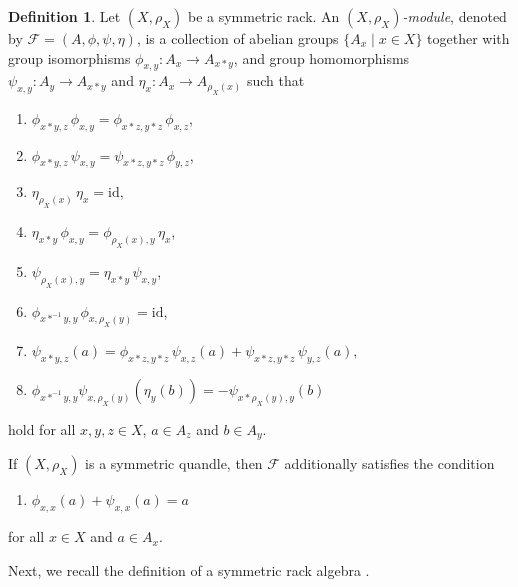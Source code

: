 \documentclass[11pt,reqno]{amsart}
\theoremstyle{definition}
\newtheorem{definition}[theorem]{Definition}
\numberwithin{equation}{subsection}
\newcommand{\id}{\mathrm{id}}
\begin{document}
\begin{definition}
Let $(X,\rho_X)$ be a symmetric rack. An {\it $(X,\rho_X)$-module}, denoted by $\mathscr{F}=(A,\phi,\psi,\eta)$, is a collection of abelian groups $\{A_x \mid x\in X\}$ together with group isomorphisms $\phi_{x,y}:A_x \rightarrow A_{x \ast y}$, and group homomorphisms $\psi_{x,y}:A_y \rightarrow A_{x \ast y}$ and $\eta_x:A_x \rightarrow A_{\rho_X(x)}$ such that 
	\begin{enumerate}[(M1)]
		\item \label{M1} $\phi_{x \ast y,z} \,\phi_{x,y}=\phi_{x \ast z,y \ast z}\,\phi_{x,z}$,
		\item \label{M2} $\phi_{x \ast y,z}\,\psi_{x,y}=\psi_{x \ast z,y \ast z}\,\phi_{y,z}$,
		\item \label{M3} $\eta_{\rho_X(x)} \,\eta_x = \id$,
		\item \label{M4} $\eta_{x \ast y} \,\phi_{x,y}= \phi_{\rho_X(x),y} \,\eta_x$,
		\item \label{M5} $\psi_{\rho_X(x),y}=\eta_{x \ast y} \,\psi_{x,y}$,
		\item \label{M6}$\phi_{x \ast^{-1}y,y}\, \phi_{x, \rho_X(y)}=\id$,
	    \item \label{M7} $\psi_{x\ast y,z}(a)= \phi_{x\ast z,y\ast z}\, \psi_{x,z}(a)+\psi_{x\ast z,y\ast z} \,\psi_{y,z}(a)$,
		\item \label{M8} $\phi_{x\ast^{-1} y,y}\psi_{x,\rho_X(y)}(\eta_{y}(b))=-\psi_{x\ast \rho_X(y),y}(b)$
	\end{enumerate}
	hold for all $x,y, z \in X$, $a \in A_z$ and $b \in A_y$.
	\par

If $(X,\rho_X)$ is a symmetric quandle, then $\mathscr{F}$ additionally satisfies the condition
	\begin{enumerate}\label{M9}
		\item [(M9)] $\phi_{x,x}(a)+\psi_{x,x}(a)=a$
	\end{enumerate} 
	for all $x \in X$ and $a\in A_x$.
\end{definition}
	
Next, we recall the definition of a symmetric rack algebra \cite[Definition 6.1]{KSS2024}. 
\end{document}
